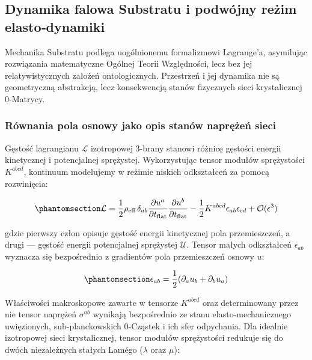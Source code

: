 \documentclass[
  polish,
  letterpaper,
  DIV=11,
  numbers=noendperiod,
  oneside]{scrartcl}
\begin{document}
\subsection{Dynamika falowa Substratu i podwójny reżim
elasto‑dynamiki}\label{sec-1-5}

Mechanika Substratu podlega uogólnionemu formalizmowi Lagrange'a,
asymilując rozwiązania matematyczne Ogólnej Teorii Względności, lecz bez
jej relatywistycznych założeń ontologicznych. Przestrzeń i jej dynamika
nie są geometryczną abstrakcją, lecz konsekwencją stanów fizycznych
sieci krystalicznej 0-Matrycy.

\subsubsection{Równania pola osnowy jako opis stanów naprężeń
sieci}\label{sec-1-5-1}

Gęstość lagrangianu \(\mathcal{L}\) izotropowej 3-brany stanowi różnicę
gęstości energii kinetycznej i potencjalnej sprężystej. Wykorzystując
tensor modułów sprężystości \(K^{abcd}\), kontinuum modelujemy w reżimie
niskich odkształceń za pomocą rozwinięcia:

\begin{equation}\protect\phantomsection\label{eq-1-5-1}{\mathcal{L} = \frac{1}{2}\rho_{\text{eff}} \, \delta_{ab} \frac{\partial u^a}{\partial t_{\text{flat}}} \frac{\partial u^b}{\partial t_{\text{flat}}} - \frac{1}{2}K^{abcd}\epsilon_{ab}\epsilon_{cd} + \mathcal{O}(\epsilon^3)}\end{equation}

gdzie pierwszy człon opisuje gęstość energii kinetycznej pola
przemieszczeń, a drugi --- gęstość energii potencjalnej sprężystej
\(\mathcal{U}\). Tensor małych odkształceń \(\epsilon_{ab}\) wyznacza
się bezpośrednio z gradientów pola przemieszczeń osnowy \(u\):

\begin{equation}\protect\phantomsection\label{eq-1-5-2}{\epsilon_{ab} = \frac{1}{2}(\partial_a u_b + \partial_b u_a)}\end{equation}

Właściwości makroskopowe zawarte w tensorze \(K^{abcd}\) oraz
determinowany przez nie tensor naprężeń \(\sigma^{ab}\) wynikają
bezpośrednio ze stanu elasto-mechanicznego uwięzionych,
sub-planckowskich 0-Cząstek i ich sfer odpychania. Dla idealnie
izotropowej sieci krystalicznej, tensor modułów sprężystości redukuje
się do dwóch niezależnych stałych Lamégo (\(\lambda\) oraz \(\mu\)):
\end{document}
